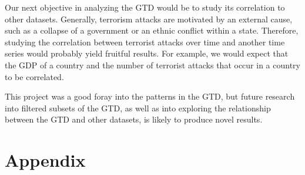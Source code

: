 \documentclass[11pt]{paper}
\begin{document}
Our next objective in analyzing the GTD would be to study its correlation to other datasets. Generally, terrorism attacks are motivated by an external cause, such as a collapse of a government or an ethnic conflict within a state. Therefore, studying the correlation between terrorist attacks over time and another time series would probably yield fruitful results. For example, we would expect that the GDP of a country and the number of terrorist attacks that occur in a country to be correlated.

This project was a good foray into the patterns in the GTD, but future research into filtered subsets of the GTD, as well as into exploring the relationship between the GTD and other datasets, is likely to produce novel results.

\section{Appendix}


\printbibliography
\end{document}
